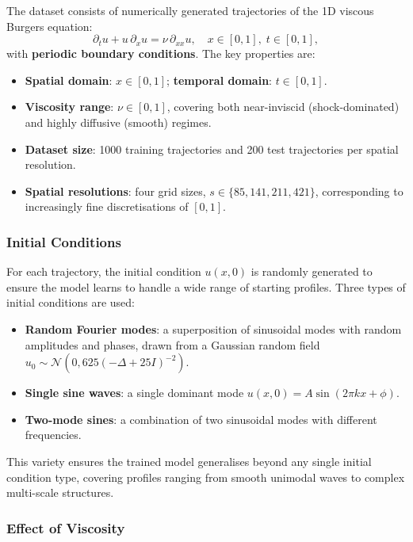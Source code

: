 The dataset consists of numerically generated trajectories of the 1D viscous Burgers equation:
\begin{equation}
  \partial_t u + u\,\partial_x u = \nu\,\partial_{xx} u, \quad x \in [0,1],\; t \in [0,1],
\end{equation}
with \textbf{periodic boundary conditions}. The key properties are:
\begin{itemize}
  \item \textbf{Spatial domain}: $x \in [0,1]$; \textbf{temporal domain}: $t \in [0,1]$.
  \item \textbf{Viscosity range}: $\nu \in [0,1]$, covering both near-inviscid (shock-dominated) and highly diffusive (smooth) regimes.
  \item \textbf{Dataset size}: 1000 training trajectories and 200 test trajectories per spatial resolution.
  \item \textbf{Spatial resolutions}: four grid sizes, $s \in \{85, 141, 211, 421\}$, corresponding to increasingly fine discretisations of $[0,1]$.
\end{itemize}

\subsubsection{Initial Conditions}

For each trajectory, the initial condition $u(x,0)$ is randomly generated to ensure the model learns to handle a wide range of starting profiles. Three types of initial conditions are used:
\begin{itemize}
  \item \textbf{Random Fourier modes}: a superposition of sinusoidal modes with random amplitudes and phases, drawn from a Gaussian random field $u_0 \sim \mathcal{N}(0, 625(-\Delta + 25I)^{-2})$.
  \item \textbf{Single sine waves}: a single dominant mode $u(x,0) = A\sin(2\pi k x + \phi)$.
  \item \textbf{Two-mode sines}: a combination of two sinusoidal modes with different frequencies.
\end{itemize}
This variety ensures the trained model generalises beyond any single initial condition type, covering profiles ranging from smooth unimodal waves to complex multi-scale structures.

\subsubsection{Effect of Viscosity}

